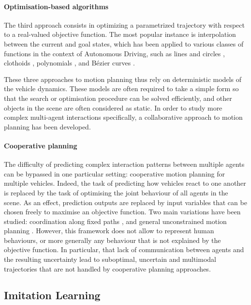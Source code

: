 \paragraph{Optimisation-based algorithms}

The third approach consists in optimizing a parametrized trajectory with respect to a real-valued objective function. The most popular instance is interpolation between the current and goal states, which has been applied to various classes of functions in the context of Autonomous Driving, such as lines and circles \citep{Reeds1990}, clothoids \citep{Funke2012}, polynomials \citep{Xu2012}, and Bézier curves \citep{Gonzalez2016}.

These three approaches to motion planning thus rely on deterministic models of the vehicle dynamics. These models are often required to take a simple form so that the search or optimisation procedure can be solved efficiently, and other objects in the scene are often considered as static. In order to study more complex multi-agent interactions specifically, a collaborative approach to motion planning has been developed.

\paragraph{Cooperative planning}

The difficulty of predicting complex interaction patterns between multiple agents can be bypassed in one particular setting: cooperative motion planning for multiple vehicles. Indeed, the task of predicting how vehicles react to one another is replaced by the task of optimising the joint behaviour of all agents in the scene. As an effect, prediction outputs are replaced by input variables that can be chosen freely to maximise an objective function. Two main variations have been studied: coordination along fixed paths \citep{Altche2016,Altche2016b,Altche2017}, and general unconstrained motion planning \citep{LaValle1998}.
However, this framework does not allow to represent human behaviours, or more generally any behaviour that is not explained by the objective function. In particular, that lack of communication between agents and the resulting uncertainty lead to suboptimal, uncertain and multimodal trajectories that are not handled by cooperative planning approaches.


\subsection{Imitation Learning}
\label{sec:imitation-learning}

